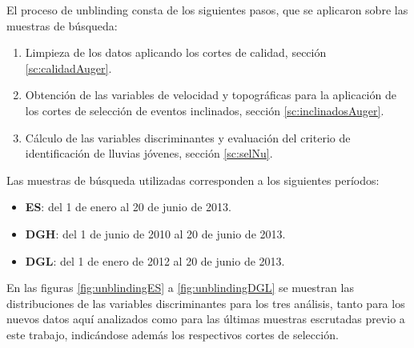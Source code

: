 	El proceso de unblinding consta de los siguientes pasos, que se aplicaron sobre las muestras de b\'usqueda:
	\begin{enumerate}
	 \item Limpieza de los datos aplicando los cortes de calidad, secci\'on \ref{sc:calidadAuger}.
	 \item Obtenci\'on de las variables de velocidad y topogr\'aficas para la aplicaci\'on de los cortes de selecci\'on de eventos inclinados, secci\'on \ref{sc:inclinadosAuger}.
	 \item C\'alculo de las variables discriminantes y evaluaci\'on del criterio de identificaci\'on de lluvias j\'ovenes, secci\'on \ref{sc:selNu}.
	\end{enumerate}
Las muestras de b\'usqueda utilizadas corresponden a los siguientes per\'iodos:
	\begin{itemize}
	 \item \textbf{ES}: del 1 de enero al 20 de junio de 2013.
	 \item \textbf{DGH}: del 1 de junio de 2010 al 20 de junio de 2013.
	 \item \textbf{DGL}: del 1 de enero de 2012 al 20 de junio de 2013.
	\end{itemize}

	En las figuras \ref{fig:unblindingES} a \ref{fig:unblindingDGL} se muestran las distribuciones de las variables discriminantes para los tres an\'alisis, tanto para los nuevos datos aqu\'i analizados como para las \'ultimas muestras escrutadas previo a este trabajo, indic\'andose adem\'as los respectivos cortes de selecci\'on.
	
